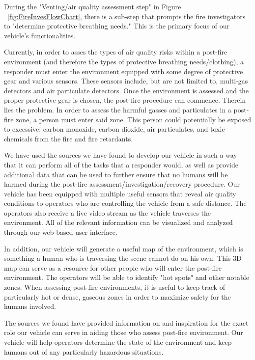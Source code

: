 During the "Venting/air quality assessment step" in Figure ~\ref{fig:FireInvesFlowChart}, there is a sub-step that prompts the fire investigators to "determine protective breathing needs."\cite{nfpa} This is the primary focus of our vehicle's functionalities.

Currently, in order to asses the types of air quality risks within a post-fire environment (and therefore the types of protective breathing needs/clothing), a responder must enter the environment equipped with some degree of protective gear and various sensors. These sensors include, but are not limited to, multi-gas detectors and air particulate detectors.\cite{evaluationofhazards} Once the environment is assessed and the proper protective gear is chosen, the post-fire procedure can commence. Therein lies the problem. In order to assess the harmful gasses and particulates in a post-fire zone, a person must enter said zone. This person could potentially be exposed to excessive: carbon monoxide, carbon dioxide, air particulates, and toxic chemicals from the fire and fire retardants. \cite{toxichazards}


We have used the sources we have found to develop our vehicle in such a way that it can perform all of the tasks that a responder would, as well as provide additional data that can be used to further ensure that no humans will be harmed during the post-fire assessment/investigation/recovery procedure. 
Our vehicle has been equipped with multiple useful sensors that reveal air quality conditions to operators who are controlling the vehicle from a safe distance. The operators also receive a live video stream as the vehicle traverses the environment. All of the relevant information can be visualized and analyzed through our web-based user interface. 

In addition, our vehicle will generate a useful map of the environment, which is something a human who is traversing the scene cannot do on his own. This 3D map can serve as a resource for other people who will enter the post-fire environment. The operators will be able to identify "hot spots" and other notable zones. When assessing post-fire environments, it is useful to keep track of particularly hot or dense, gaseous zones in order to maximize safety for the humans involved. \cite{recoveringfromwildfire}

The sources we found have provided information on and inspiration for the exact role our vehicle can serve in aiding those who assess post-fire environment. Our vehicle will help operators determine the state of the environment and keep humans out of any particularly hazardous situations. 





